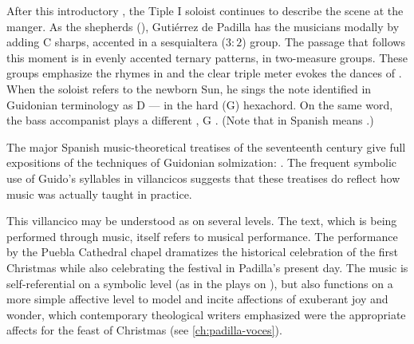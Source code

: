 After this introductory , the Tiple I soloist continues to
describe the scene at the manger.  
As the shepherds  (),
Gutiérrez de Padilla has the musicians  modally by adding C
sharps, accented in a sesquialtera ($3:2$) group.
The passage that follows this moment is in evenly accented ternary patterns, in
two-measure groups.  
These groups emphasize the rhymes in 
and the clear triple meter evokes the dances of .
When the soloist refers to the newborn Sun, he sings the note identified in
Guidonian terminology as D --- in the hard (G)
hexachord.  
On the same word, the bass accompanist plays a different , G
. 
(Note that  in Spanish means .)%
\begin{Footnote}
    The major Spanish music-theoretical treatises of the seventeenth century
    give full expositions of the techniques of Guidonian solmization:
    \autocites{Cerone:Melopeo}{Lorente:Porque}.
    The frequent symbolic use of Guido's syllables in villancicos suggests that
    these treatises do reflect how music was actually taught in practice.
\end{Footnote}


This villancico may be understood as  on several
levels.  
The text, which is being performed through music, itself refers to musical
performance.
The performance by the Puebla Cathedral chapel dramatizes the historical
celebration of the first Christmas while also celebrating the festival in
Padilla's present day.  
The music is self-referential on a symbolic level (as in the plays on
), but also functions on a more simple affective level to model and
incite affections of exuberant joy and wonder, which contemporary theological
writers emphasized were the appropriate affects for the feast of Christmas (see
\cref{ch:padilla-voces}).

